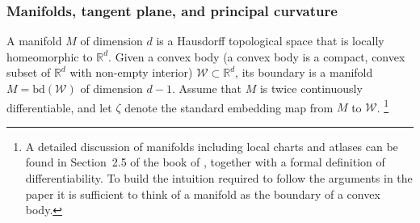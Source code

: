 \documentclass[english]{article}
\newcommand{\cW}{\mathcal{W}}
\newcommand{\real}{\mathbb{R}}
\newcommand{\R}{\mathbb{R}}
\newcommand{\bd}{\mathrm{bd}}
\begin{document}
\subsubsection{Manifolds, tangent plane, and principal curvature}
\label{sec:app_manifold}
A manifold $M$ of dimension $d$ is a Hausdorff topological space that is locally homeomorphic to $\real^d$. 
%  
Given a convex body (a convex body is a compact, convex subset of $\R^d$ with non-empty interior) $\cW \subset \real^d$, its boundary is a manifold $M = \bd(\cW)$ of dimension $d-1$. Assume that $M$ is twice continuously differentiable, and let $\zeta$ denote the standard embedding map from $M$ to $\cW$.%
\footnote{A detailed discussion of manifolds including local charts and atlases can be found in Section~2.5 of the book of  \citet{Sch14:ConvexBodies}, together with a formal definition of differentiability. To build the intuition required to follow the arguments in the paper it is sufficient to think of a manifold as the boundary of a convex body.}
\end{document}
